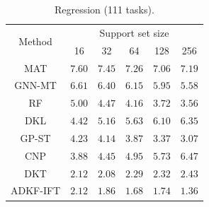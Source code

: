 \begin{table}
\begin{subtable}{.49\linewidth}
                \caption{Regression (111 tasks).}
                \centering
                \begin{tabular}{cccccc}
                    \toprule
                    \multirow{2}[3]{*}{Method} & \multicolumn{5}{c}{Support set size}\\
                    \cmidrule(lr){2-6}
                    & 16 & 32 & 64 & 128 & 256 \\
                    \midrule
                    MAT & $7.60$ & $7.45$ & $7.26$ & $7.06$ & $7.19$ \\
                    GNN-MT & $6.61$ & $6.40$ & $6.15$ & $5.95$ & $5.58$ \\
                    RF & $5.00$ & $4.47$ & $4.16$ & $3.72$ & $3.56$ \\
                    DKL & $4.42$ & $5.16$ & $5.63$ & $6.10$ & $6.35$ \\
                    GP-ST & $4.23$ & $4.14$ & $3.87$ & $3.37$ & $3.07$ \\
                    CNP & $3.88$ & $4.45$ & $4.95$ & $5.73$ & $6.47$ \\
                    DKT & $\mathbf{2.12}$ & $2.08$ & $2.29$ & $2.32$ & $2.43$ \\
                    ADKF-IFT & $\mathbf{2.12}$ & $\mathbf{1.86}$ & $\mathbf{1.68}$ & $\mathbf{1.74}$ & $\mathbf{1.36}$ \\
                    \bottomrule
                \end{tabular}
            \end{subtable}
        \end{table}
        
